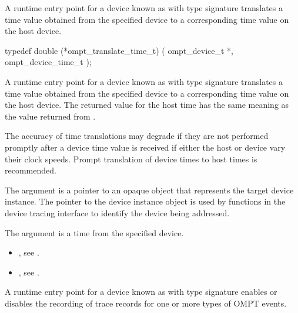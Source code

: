\label{sec:ompt_translate_time_t}

\summary
A runtime entry point for a device known
as 
with type signature  translates
a time value obtained from the specified device to a corresponding time
value on the host device.

\format
\begin{ccppspecific}
\begin{omptInquiry}
typedef double (*ompt_translate_time_t) (
  ompt_device_t *,
  ompt_device_time_t 
);
\end{omptInquiry}
\end{ccppspecific}

\descr
A runtime entry point for a device known as 
with type signature  translates
a time value obtained from the specified device to a corresponding time
value on the host device. The returned value for the host time has
the same meaning as the value returned from .

\begin{note}
The accuracy of time translations may degrade if they are not
performed promptly after a device time value is received if either
the host or device vary their clock speeds. Prompt translation of
device times to host times is recommended.
\end{note}

\argdesc

The argument  is a pointer to an opaque object that
represents the target device instance. The pointer to the device
instance object is used by functions in the device tracing interface
to identify the device being addressed.

The argument  is a time from the specified device.

\crossreferences
\begin{itemize}
\item {},
see .
\item {},
see .
\end{itemize}

\label{sec:ompt_set_trace_ompt_t}

\summary
A runtime entry point for a device known as 
with type signature 
enables or disables the recording of trace records for one or more
types of OMPT events.

